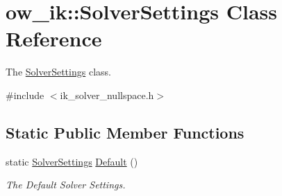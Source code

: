 \hypertarget{classow__ik_1_1SolverSettings}{}\section{ow\+\_\+ik\+:\+:Solver\+Settings Class Reference}
\label{classow__ik_1_1SolverSettings}


The \hyperlink{classow__ik_1_1SolverSettings}{Solver\+Settings} class.  




{\ttfamily \#include $<$ik\+\_\+solver\+\_\+nullspace.\+h$>$}

\subsection*{Static Public Member Functions}
\begin{DoxyCompactItemize}
\item 
static \hyperlink{classow__ik_1_1SolverSettings}{Solver\+Settings} \hyperlink{classow__ik_1_1SolverSettings_a4dcbab3529df7f321226cd65da491701}{Default} ()\hypertarget{classow__ik_1_1SolverSettings_a4dcbab3529df7f321226cd65da491701}{}\label{classow__ik_1_1SolverSettings_a4dcbab3529df7f321226cd65da491701}

\begin{DoxyCompactList}\small\item\em The Default Solver Settings. \end{DoxyCompactList}\end{DoxyCompactItemize}

